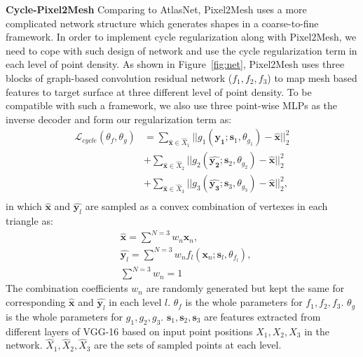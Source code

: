 \noindent\textbf{Cycle-Pixel2Mesh}
Comparing to AtlasNet, Pixel2Mesh uses a more complicated network structure which generates shapes in a coarse-to-fine framework. In order to implement cycle regularization along with Pixel2Mesh, we need to cope with such design of network and use the cycle regularization term in each level of point density.
As shown in Figure~\ref{fig:net}, Pixel2Mesh uses three blocks of graph-based convolution residual network ($f_1,f_2,f_3$) to map mesh based features to target surface at three different level of point density. To be compatible with such a framework, we also use three point-wise MLPs as the inverse decoder and form our regularization term as:
\begin{equation}
\begin{aligned}
\mathcal{L}_{cycle}(\theta_f,\theta_g) 
&= \sum_{\hat{\mathbf{x}} \in \hat{X}_1}||g_{1}(\hat{\mathbf{y_1}};\mathbf{s}_1,\theta_{g_1}) - \hat{\mathbf{x}}||_2^2\\
&+ \sum_{\hat{\mathbf{x}} \in \hat{X}_2}||g_{2}(\hat{\mathbf{y_2}};\mathbf{s}_2,\theta_{g_2}) - \hat{\mathbf{x}}||_2^2\\
&+ \sum_{\hat{\mathbf{x}} \in \hat{X}_3}||g_{3}(\hat{\mathbf{y_3}};\mathbf{s}_3,\theta_{g_3}) - \hat{\mathbf{x}}||_2^2,\\
\end{aligned}
\end{equation}
in which $\hat{\mathbf{x}}$ and $\hat{\mathbf{y}_l}$ are sampled as a convex combination of vertexes in each triangle as:
\begin{equation}
\begin{aligned}
\label{equ:sample}
&\hat{\mathbf{x}} = \sum^{N=3} w_n\mathbf{x}_n, \\
&\hat{\mathbf{y}_l} = \sum^{N=3} w_nf_l(\mathbf{x}_n;\mathbf{s}_l,\theta_{f_l}),\\
&\sum^{N=3} w_n = 1
\end{aligned}
\end{equation}
The combination coefficients $w_n$ are randomly generated but kept the same for corresponding $\hat{\mathbf{x}}$ and $\hat{\mathbf{y}_l}$ in each level $l$. $\theta_f$ is the whole parameters for $f_1,f_2,f_3$. $\theta_g$ is the whole parameters for $g_1,g_2,g_3$. $\mathbf{s}_1,\mathbf{s}_2,\mathbf{s}_3$ are features extracted from different layers of VGG-16 based on input point positions $X_1,X_2,X_3$ in the network. $\hat{X}_1,\hat{X}_2,\hat{X}_3$ are the sets of sampled points at each level. 
